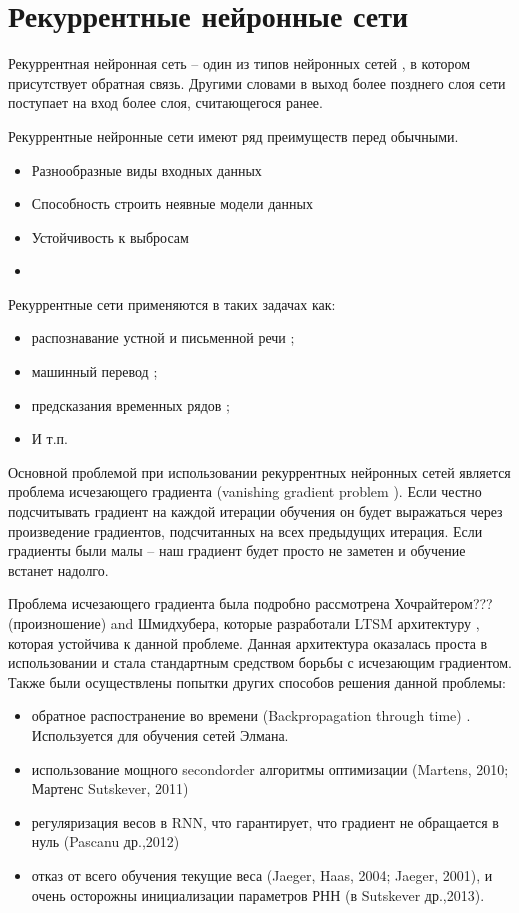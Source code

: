 \section{Рекуррентные нейронные сети}
Рекуррентная нейронная сеть – один из типов нейронных сетей \cite{neural_network}, в котором присутствует обратная связь. Другими словами в выход более позднего слоя сети поступает на вход более слоя, считающегося ранее.

Рекуррентные нейронные сети имеют ряд преимуществ перед обычными.
\begin{itemize}
	\item Разнообразные виды входных данных
	\item Способность строить неявные модели данных
	\item Устойчивость к выбросам
	\item 
\end{itemize}

Рекуррентные сети применяются в таких задачах как:
\begin{itemize}
	\item распознавание устной и письменной речи \cite{rnn_for_speech_recognition, rnn_for_text_recognition};
	\item машинный перевод \cite{rnn_for_translation};
	\item предсказания временных рядов \cite{rnn_for_prediction};
	\item И т.п.
\end{itemize}



Основной проблемой при использовании рекуррентных нейронных сетей является проблема исчезающего градиента (vanishing gradient problem \cite{vanishing_gradient_problem}). Если честно подсчитывать градиент на каждой итерации обучения он будет выражаться через произведение градиентов, подсчитанных на всех предыдущих итерация. Если градиенты были малы – наш градиент будет просто не заметен и обучение встанет надолго. 

Проблема исчезающего градиента была подробно рассмотрена Хочрайтером???(произношение) and Шмидхубера, которые разработали LTSM архитектуру \cite{create_lstm}, которая устойчива к данной проблеме. Данная архитектура оказалась проста в использовании и стала стандартным средством борьбы с исчезающим градиентом. Также были осуществлены попытки других способов решения данной проблемы:
\begin{itemize}
	\item обратное распостранение во времени (Backpropagation through time) \cite{Backpropagation}. Используется для обучения сетей Элмана.
	\item использование мощного secondorder алгоритмы оптимизации (Martens, 2010; Мартенс Sutskever, 2011)
	\item регуляризация весов в RNN, что гарантирует, что градиент не обращается в нуль (Pascanu др.,2012)
	\item отказ от всего обучения текущие веса (Jaeger, Haas, 2004; Jaeger, 2001), и очень
	осторожны инициализации параметров РНН (в Sutskever др.,2013).
\end{itemize}
	
